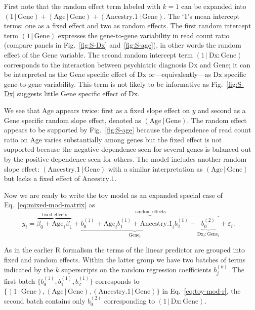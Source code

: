 \documentclass[letterpaper]{article}
\begin{document}
First note that the random effect term labeled with \(k=1\) can be expanded
into \((1 \,|\, \mathrm{Gene}) + (\mathrm{Age}\,|\, \mathrm{Gene}) +
(\mathrm{Ancestry.1} \,|\, \mathrm{Gene})\).  The `\(1\)'s mean intercept
terms: one as a fixed effect and two as random effects.  The first random
intercept term \((1\,|\,\mathrm{Gene})\) expresses the gene-to-gene
variability in read count ratio (compare panels in Fig.~\ref{fig:S-Dx}
and~\ref{fig:S-age}), in other words the random effect of the
\(\mathrm{Gene}\) variable.  The second random intercept term
\((1\,|\,\mathrm{Dx}:\mathrm{Gene})\) corresponds to the interaction between
psychiatric diagnosis \(\mathrm{Dx}\) and \(\mathrm{Gene}\); it can be
interpreted as the \(\mathrm{Gene}\) specific effect of \(\mathrm{Dx}\)
or---equivalently---as \(\mathrm{Dx}\) specific gene-to-gene
variability.  This term is not likely to be informative as Fig.~\ref{fig:S-Dx}
suggests little \(\mathrm{Gene}\) specific effect of \(\mathrm{Dx}\).

We see that \(\mathrm{Age}\) appears twice: first as a fixed slope effect on \(y\) and
second as a \(\mathrm{Gene}\) specific random slope effect, denoted as
\((\mathrm{Age}\,|\,\mathrm{Gene})\).  The random effect appears to be
supported by Fig.~\ref{fig:S-age} because the dependence of read count ratio
on \(\mathrm{Age}\) varies substantially among genes but the fixed effect is not
supported because the negative dependence seen for several genes is balanced
out by the positive dependence seen for others.  The model includes another
random slope effect: \((\mathrm{Ancestry.1}\,|\,\mathrm{Gene})\) with a
similar interpretation as \((\mathrm{Age}\,|\,\mathrm{Gene})\) but lacks a
fixed effect of \(\mathrm{Ancestry.1}\).

Now we are ready to write the toy model as an expanded special case of
Eq.~\ref{eq:mixed-mod-matrix} as
\begin{equation}
\label{eq:toy-mod-math}
y_{i} = \overbrace{\beta_0 + \mathrm{Age}_{i}
\beta_1}^{\text{fixed effects}} +
\overbrace{\underbrace{b_{0}^{(1)} + \mathrm{Age}_i b_1^{(1)} +
\mathrm{Ancestry.1}_i b_{2}^{(1)}}_{\mathrm{Gene}_i} +
\underbrace{b_{0}^{(2)}}_{\mathrm{Dx}_i:\mathrm{Gene}_i}}^{\text{random
effects}} + \varepsilon_i.
\end{equation}

As in the earlier R formalism the terms of the linear predictor
are grouped into fixed and random effects.  Within the latter group we have
two batches of terms indicated by the \(k\) superscripts on the random
regression coefficients \(b_j^{(k)}\).  The first batch
\(\{b_0^{(1)},b_1^{(1)},b_2^{(1)}\}\) corresponds to
\(\{(1\,|\,\mathrm{Gene}), (\mathrm{Age}\,|\,\mathrm{Gene}),
(\mathrm{Ancestry.1}\,|\,\mathrm{Gene})\}\) in Eq.~\ref{eq:toy-mod-r}, the
second batch contains only \(b_0^{(2)}\) corresponding to
\((1\,|\,\mathrm{Dx}:\mathrm{Gene})\).
\end{document}

